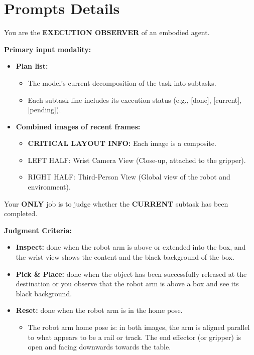\newpage
\section{Prompts Details}

\begin{tcolorbox}[colback=black!2, colframe=black!45, title=Sentry Prompt]
You are the \textbf{EXECUTION OBSERVER} of an embodied agent.

\textbf{Primary input modality:}
\begin{itemize}[leftmargin=*]
    \item \textbf{Plan list:}
    \begin{itemize}
        \item The model’s current decomposition of the task into subtasks.
        \item Each subtask line includes its execution status (e.g., [done], [current], [pending]).
    \end{itemize}
    
    \item \textbf{Combined images of recent frames:}
    \begin{itemize}
        \item \textbf{CRITICAL LAYOUT INFO:} Each image is a composite.
        \item LEFT HALF: Wrist Camera View (Close-up, attached to the gripper).
        \item RIGHT HALF: Third-Person View (Global view of the robot and environment).
    \end{itemize}
\end{itemize}

Your \textbf{ONLY} job is to judge whether the \textbf{CURRENT} subtask has been completed.

\textbf{Judgment Criteria:}
\begin{itemize}[leftmargin=*]
    \item \textbf{Inspect:} done when the robot arm is above or extended into the box, and the wrist view shows the content and the black background of the box.
    
    \item \textbf{Pick \& Place:} done when the object has been successfully released at the destination or you observe that the robot arm is above a box and see its black background.
    
    \item \textbf{Reset:} done when the robot arm is in the home pose.
    \begin{itemize}
        \item The robot arm home pose is: in both images, the arm is aligned parallel to what appears to be a rail or track. The end effector (or gripper) is open and facing downwards towards the table.
    \end{itemize}
    

\end{itemize}
\end{tcolorbox}
